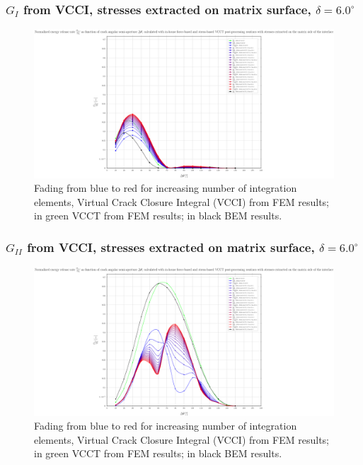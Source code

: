 \begin{frame}
\frametitle{\small $G_{I}$ from VCCI, stresses extracted on matrix surface, $\delta=6.0^{\circ}$}
\vspace{-0.5cm}
\centering
\captionsetup[figure]{font=scriptsize,labelfont=scriptsize}
\begin{figure}[!h]
\centering
\includegraphics[height=0.7\textheight]{2017-07-25_AbqRunSummary_SmallStrain_D06/pdf/2017-07-25_AbqRunSummary_SmallStrain_D06_F-SoM-VCCT_GI.pdf}
  \caption{\scriptsize Fading from blue to red for increasing number of integration elements, Virtual Crack Closure Integral (VCCI) from FEM results; in green VCCT from FEM results; in black BEM results.}
  \label{fig:res1}
\end{figure}
\end{frame}
\begin{frame}
\frametitle{\small $G_{II}$ from VCCI, stresses extracted on matrix surface, $\delta=6.0^{\circ}$}
\vspace{-0.5cm}
\centering
\captionsetup[figure]{font=scriptsize,labelfont=scriptsize}
\begin{figure}[!h]
\centering
\includegraphics[height=0.7\textheight]{2017-07-25_AbqRunSummary_SmallStrain_D06/pdf/2017-07-25_AbqRunSummary_SmallStrain_D06_F-SoM-VCCT_GII.pdf}
  \caption{\scriptsize Fading from blue to red for increasing number of integration elements, Virtual Crack Closure Integral (VCCI) from FEM results; in green VCCT from FEM results; in black BEM results.}
  \label{fig:res1}
\end{figure}
\end{frame}
